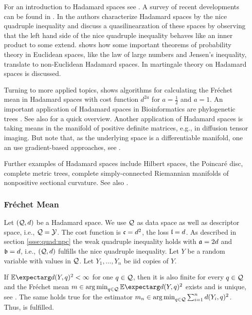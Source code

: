 For an introduction to Hadamard spaces see \cite{bacak14}. A survey of recent developments can be found in \cite{bacak18}. 
In \cite{berg08} the authors characterize Hadamard spaces by the nice quadruple inequality and discuss a quasilinearzation of these spaces by observing that the left hand side of the nice quadruple inequality behaves like an inner product to some extend. \cite{sturm03} shows how some important theorems of probability theory in Euclidean spaces, like the law of large numbers and Jensen's inequality, translate to non-Euclidean Hadamard spaces. In \cite{sturm02} martingale theory on Hadamard spaces is discussed.

Turning to more applied topics, \cite{bacak14b} shows algorithms for calculating the Fréchet mean in Hadamard spaces with cost function $d^{2a}$ for $a=\frac12$ and $a=1$.
An important application of Hadamard spaces in Bioinformatics are phylogenetic trees \cite{billera01}. See also \cite[section 6.3]{bacak18} for a quick overview. Another application of Hadamard spaces is taking means in the manifold of positive definite matrices, e.g., in diffusion tensor imaging. But note that, as the underlying space is a differentiable manifold, one an use gradient-based approaches, see \cite{pennec06}.

Further examples of Hadamard spaces include Hilbert spaces, the Poincaré disc, complete metric trees, complete simply-connected Riemannian manifolds of nonpositive sectional curvature. See also \cite[section 3]{sturm03}.
%
%
%
\subsubsection{Fréchet Mean}\label{sssec:app:hadamard:fm}
%
Let $(\mathcal{Q}, d)$ be a Hadamard space. We use $\mathcal{Q}$ as data space as well as descriptor space, i.e., $\mathcal{Q} = \mathcal{Y}$. The cost function is $\mathfrak{c}=d^2$, the loss $\mathfrak{l} = d$. As described in section  \ref{ssse:quad:npc} the weak quadruple inequality holds with $\mathfrak{a} = 2d$ and $\mathfrak{b} = d$, i.e., $(\mathcal{Q},d)$ fulfills the nice quadruple inequality.
Let $Y$ be a random variable with values in $\mathcal{Q}$. Let $Y_1, \dots, Y_n$ be iid copies of $Y$.

If $\Ex{d(Y,q)^2} < \infty$ for one $q\in\mathcal{Q}$, then it is also finite for every $q\in\mathcal{Q}$ and the Fréchet mean $m\in\argmin_{q\in\mc Q} \Ex{d(Y,q)^2}$ exists and is unique, see \cite[Proposition 4.3]{sturm03}. The same holds true for the estimator $m_n\in\operatorname*{arg\,min}_{q\in\mathcal{Q}} \sum_{i=1}^n{d(Y_i,q)^2}$. Thus,  is fulfilled.

